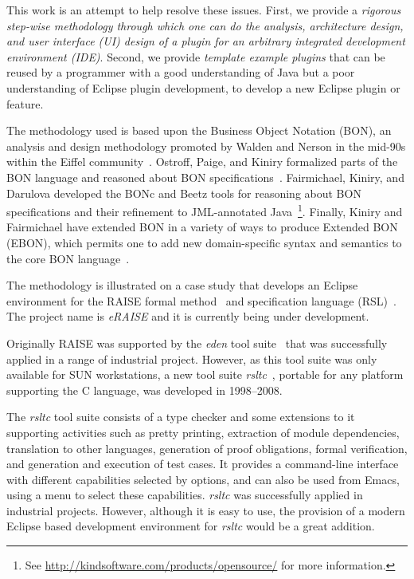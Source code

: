 \documentclass[conference]{IEEEtran}
\begin{document}
This work is an attempt to help resolve these issues.  First, we
provide a \emph{rigorous step-wise methodology through which one can
  do the analysis, architecture design, and user interface (UI) design of a plugin for
  an arbitrary integrated development environment (IDE)}.  Second, we provide \emph{template example
  plugins} that can be reused by a programmer with a good
understanding of Java but a poor understanding of Eclipse plugin
development, to develop a new Eclipse plugin or feature.

The methodology used is based upon the Business Object Notation (BON),
an analysis and design methodology promoted by Walden and Nerson in
the mid-90s within the Eiffel community~\cite{WaldenNerson95}.
Ostroff, Paige, and Kiniry formalized parts of the BON language and
reasoned about BON
specifications~\cite{LancaricOstroffPaige02,EBON01,PaigeEtal02,PaigeOstroff01b}.
Fairmichael, Kiniry, and Darulova developed the BONc and Beetz tools
for reasoning about BON specifications and their refinement to
JML-annotated Java~\footnote{See
  \url{http://kindsoftware.com/products/opensource/} for more
  information.}.  Finally, Kiniry and Fairmichael have extended BON in
a variety of ways to produce Extended BON (EBON), which permits one to
add new domain-specific syntax and semantics to the core BON
language~\cite{Kiniry02-PhDThesis}.

The methodology is illustrated on a case study that develops an
Eclipse environment for the RAISE formal method~\cite{RMG95} and
specification language (RSL)~\cite{RLG92}. The project name is
\emph{eRAISE} and it is currently being under development.

Originally RAISE was supported by the \emph{eden} tool
suite~\cite{edenReferenceManual} that was successfully applied in a
range of industrial project.  However, as this tool suite was only
available for SUN workstations, a new tool suite
\emph{rsltc}~\cite{rsltcUserGuide,RAISETools2003}, portable for any
platform supporting the C language, was developed in 1998--2008. 

The \emph{rsltc} tool suite consists of a type checker and some
extensions to it supporting activities such as pretty printing,
extraction of module dependencies, translation to other languages,
generation of proof obligations, formal verification, and generation
and execution of test cases. It provides a command-line interface with
different capabilities selected by options, and can also be used from
Emacs, using a menu to select these capabilities.  \emph{rsltc} was
successfully applied in industrial projects. However, although it is
easy to use, the provision of a modern Eclipse based development
environment for \emph{rsltc} would be a great addition.
\end{document}
